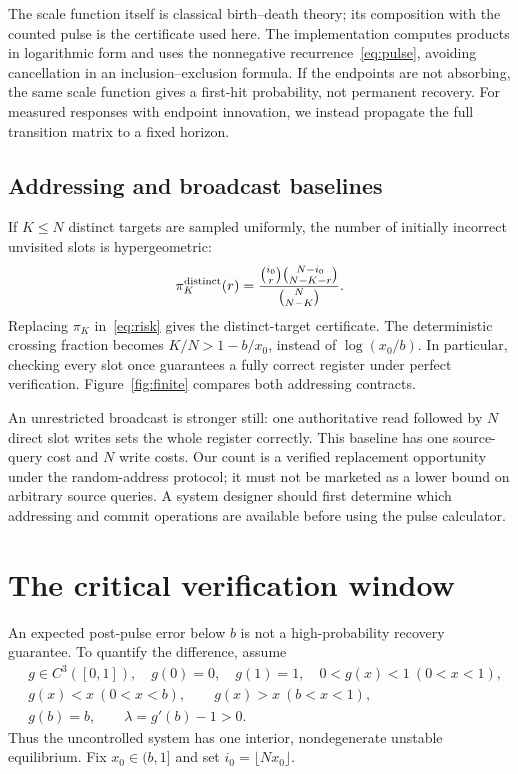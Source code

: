 \documentclass[11pt]{article}
\theoremstyle{remark}\newtheorem{remark}[theorem]{Remark}
\begin{document}
The scale function itself is classical birth--death theory; its composition with the counted pulse is the certificate used here. The implementation computes products in logarithmic form and uses the nonnegative recurrence~\eqref{eq:pulse}, avoiding cancellation in an inclusion--exclusion formula. If the endpoints are not absorbing, the same scale function gives a first-hit probability, not permanent recovery. For measured responses with endpoint innovation, we instead propagate the full transition matrix to a fixed horizon.

\subsection{Addressing and broadcast baselines}
If $K\le N$ distinct targets are sampled uniformly, the number of initially incorrect unvisited slots is hypergeometric:
\begin{equation}
 \pi_K^{\rm distinct}(r)=
 \frac{{i_0\choose r}{N-i_0\choose N-K-r}}{{N\choose N-K}}.
 \label{eq:hypergeom}
\end{equation}
Replacing $\pi_K$ in~\eqref{eq:risk} gives the distinct-target certificate. The deterministic crossing fraction becomes $K/N>1-b/x_0$, instead of $\log(x_0/b)$. In particular, checking every slot once guarantees a fully correct register under perfect verification. Figure~\ref{fig:finite} compares both addressing contracts.

An unrestricted broadcast is stronger still: one authoritative read followed by $N$ direct slot writes sets the whole register correctly. This baseline has one source-query cost and $N$ write costs. Our count is a verified replacement opportunity under the random-address protocol; it must not be marketed as a lower bound on arbitrary source queries. A system designer should first determine which addressing and commit operations are available before using the pulse calculator.

\section{The critical verification window}
\label{sec:window}
An expected post-pulse error below $b$ is not a high-probability recovery guarantee. To quantify the difference, assume
\begin{align}
 &g\in C^3([0,1]),\quad g(0)=0,\quad g(1)=1,\quad 0<g(x)<1\ (0<x<1),\nonumber\\
 &g(x)<x\ (0<x<b),\qquad g(x)>x\ (b<x<1),\nonumber\\
 &g(b)=b,\qquad \lambda=g'(b)-1>0.
 \label{eq:assumptions}
\end{align}
Thus the uncontrolled system has one interior, nondegenerate unstable equilibrium. Fix $x_0\in(b,1]$ and set $i_0=\lfloor Nx_0\rfloor$.
\end{document}
